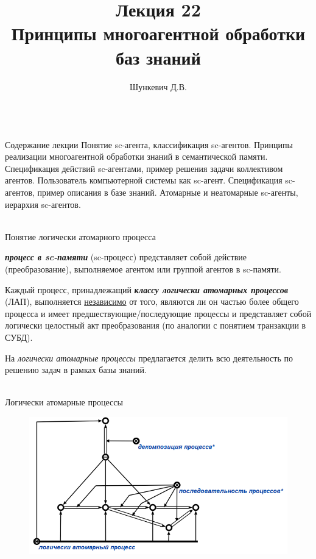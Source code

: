 \title{Лекция 22\\Принципы многоагентной обработки баз знаний}
\author[]{Шункевич Д.В.}

\begin{frame}
	\titlepage
\end{frame}

\begin{frame}{\\Содержание лекции}
	\topline
	\justifying
	Понятие sc-агента, классификация sc-агентов. Принципы реализации многоагентной обработки знаний в семантической памяти. Спецификация действий sc-агентами, пример решения задачи коллективом агентов. Пользователь компьютерной системы как sc-агент. Спецификация sc-агентов, пример описания в базе знаний. Атомарные и неатомарные sc-агенты, иерархия sc-агентов.
\end{frame}

\begin{frame}{\\Понятие логически атомарного процесса}
	\topline
	\justifying
	
	\begin{textitemize}
	\item \textbf{\textit{процесс в sc-памяти}} (sc-процесс) представляет собой действие (преобразование), выполняемое агентом или группой агентов в sc-памяти.
	\item Каждый процесс, принадлежащий \textbf{\textit{классу логически атомарных процессов}} (ЛАП), выполняется \underline{независимо} от того, являются ли он частью более общего процесса и имеет предшествующие/последующие процессы и представляет собой логически целостный акт преобразования (по аналогии с понятием транзакции в СУБД).
	\item На \textit{логически атомарные процессы} предлагается делить всю деятельность по решению задач в рамках базы знаний.
	\end{textitemize}
\end{frame}

\begin{frame}{\\Логически атомарные процессы}
	\topline
	\justifying
	\vspace{3em}
	\begin{figure}[H]
		\includegraphics[scale=0.5]{./figures/sd_multiagent_processing/lap.png}
	\end{figure}
\end{frame}

